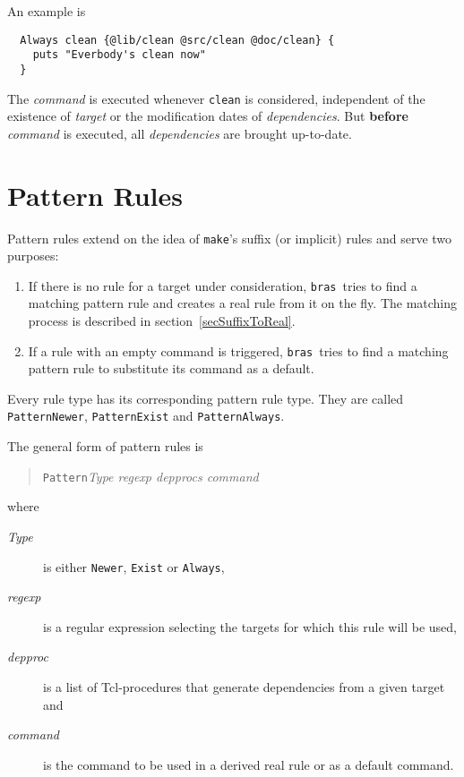 \documentclass[12pt]{article}
\newcommand{\bras}{\texttt{bras}}
\newcommand{\make}{\texttt{make}}
\begin{document}
An example is
\begin{verbatim}
  Always clean {@lib/clean @src/clean @doc/clean} {
    puts "Everbody's clean now"
  }
\end{verbatim}

The \textit{command} is executed whenever \texttt{clean} is
considered, independent of the existence of \textit{target} or the
modification dates of \textit{dependencies}.  But \textbf{before}
\textit{command} is executed, all
\textit{dependencies} are brought up-to-date.

\section{Pattern Rules}

Pattern rules extend on the idea of \make's suffix (or implicit)
rules and serve two purposes:

\begin{enumerate}
\item If there is no rule for a target under consideration, \bras\
tries to find a matching pattern rule and creates a real rule from it on
the fly. The matching process is described in
section~\ref{secSuffixToReal}.
\item If a rule with an empty command is triggered, \bras\ tries
to find a matching pattern rule to substitute its command as a default.
\end{enumerate}

Every rule type has its corresponding pattern rule type. They
are called
\texttt{PatternNewer}, \texttt{PatternExist} and
\texttt{PatternAlways}.

The general form of pattern rules is
\begin{quote}
\texttt{Pattern}\textit{Type regexp depprocs command}
\end{quote}

where 

\begin{description}
\item[\textit{Type}] is either \texttt{Newer}, \texttt{Exist} or
\texttt{Always},
\item[\textit{regexp}] is a regular expression selecting the targets
for which this rule will be used,
\item[\textit{depproc}] is a list of Tcl-procedures that generate
dependencies from a given target and
\item[\textit{command}] is the command to be used in a derived real
rule or as a default command.
\end{description}
\end{document}
